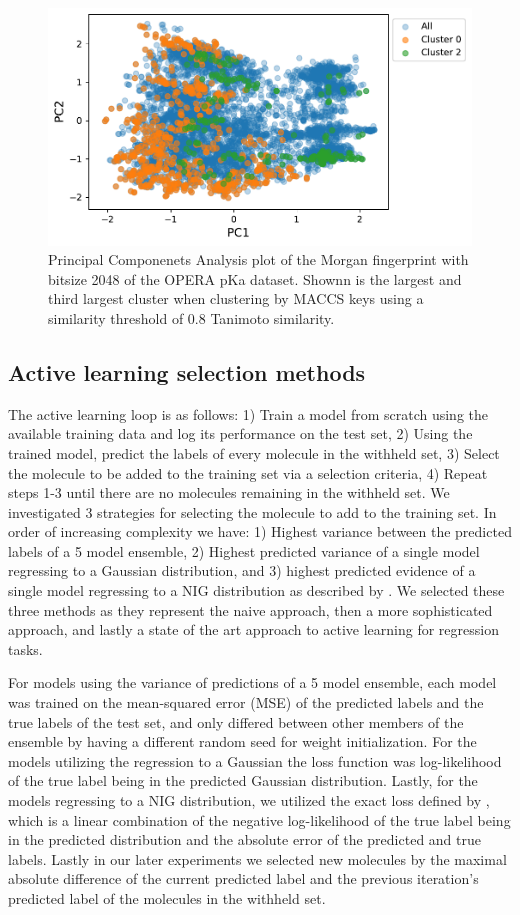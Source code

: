 \documentclass[journal=jmcmar,manuscript=article]{achemso}
\begin{document}
\begin{figure}[tbph]
    \centering
    \includegraphics[width=.6\linewidth]{figures/fig1_pca.pdf}
    \caption{Principal Componenets Analysis plot of the Morgan fingerprint with bitsize 2048 of the OPERA pKa dataset. Shownn is the largest and third largest cluster when clustering by MACCS keys using a similarity threshold of 0.8 Tanimoto similarity.}
    \label{fig:pcaclusters}
\end{figure}

\subsection{Active learning selection methods}
The active learning loop is as follows: 1) Train a model from scratch using the available training data and log its performance on the test set, 2) Using the trained model, predict the labels of every molecule in the withheld set, 3) Select the molecule to be added to the training set via a selection criteria, 4) Repeat steps 1-3 until there are no molecules remaining in the withheld set. We investigated 3 strategies for selecting the molecule to add to the training set. In order of increasing complexity we have: 1) Highest variance between the predicted labels of a 5 model ensemble, 2) Highest predicted variance of a single model regressing to a Gaussian distribution, and 3) highest predicted evidence of a single model regressing to a NIG distribution as described by \citet{alnigregress}. We selected these three methods as they represent the naive approach, then a more sophisticated approach, and lastly a state of the art approach to active learning for regression tasks.

For models using the variance of predictions of a 5 model ensemble, each model was trained on the mean-squared error (MSE) of the predicted labels and the true labels of the test set, and only differed between other members of the ensemble by having a different random seed for weight initialization. For the models utilizing the regression to a Gaussian the loss function was log-likelihood of the true label being in the predicted Gaussian distribution. Lastly, for the models regressing to a NIG distribution, we utilized the exact loss defined by \citet{alnigregress}, which is a linear combination of the negative log-likelihood of the true label being in the predicted distribution and the absolute error of the predicted and true labels. Lastly in our later experiments we selected new molecules by the maximal absolute difference of the current predicted label and the previous iteration's predicted label of the molecules in the withheld set.
\end{document}
